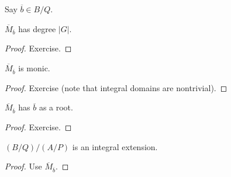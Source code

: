 Say $\overline{b}\in B/Q$.

\begin{theorem}
  \label{MulSemiringAction.CharacteristicPolynomial.Mbar_deg}
  $\overline{M}_{\overline{b}}$ has degree $|G|$.
\end{theorem}
\begin{proof} Exercise.
\end{proof}

\begin{theorem}
  \label{MulSemiringAction.CharacteristicPolynomial.Mbar_monic}
    $\overline{M}_{\overline{b}}$ is monic.
\end{theorem}
\begin{proof} Exercise (note that integral domains are nontrivial).
\end{proof}

\begin{theorem}
  \label{MulSemiringAction.CharacteristicPolynomial.Mbar_eval_eq_zero}
  $\overline{M}_{\overline{b}}$ has $\overline{b}$ as a root.
\end{theorem}
\begin{proof} Exercise.
\end{proof}

\begin{theorem}
  \label{MulSemiringAction.reduction_isIntegral}
  $(B/Q)/(A/P)$ is an integral extension.
\end{theorem}
\begin{proof}
  Use $\overline{M}_{\overline{b}}$.
\end{proof}

